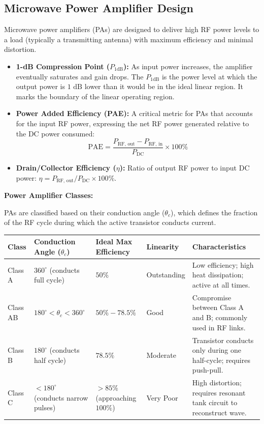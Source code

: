 \documentclass[12pt,a4paper]{article}
\renewcommand{\arraystretch}{1.45}
\begin{document}
\subsection{Microwave Power Amplifier Design}
Microwave power amplifiers (PAs) are designed to deliver high RF power levels to a load (typically a transmitting antenna) with maximum efficiency and minimal distortion.
\begin{itemize}[leftmargin=*, itemsep=3pt]
  \item \textbf{1-dB Compression Point ($P_{1\text{dB}}$):} As input power increases, the amplifier eventually saturates and gain drops. The $P_{1\text{dB}}$ is the power level at which the output power is $1\text{ dB}$ lower than it would be in the ideal linear region. It marks the boundary of the linear operating region.
  \item \textbf{Power Added Efficiency (PAE):} A critical metric for PAs that accounts for the input RF power, expressing the net RF power generated relative to the DC power consumed:
    \begin{equation}
      \text{PAE} = \frac{P_{\text{RF, out}} - P_{\text{RF, in}}}{P_{\text{DC}}} \times 100\%
    \end{equation}
  \item \textbf{Drain/Collector Efficiency ($\eta$):} Ratio of output RF power to input DC power: $\eta = P_{\text{RF, out}}/P_{\text{DC}} \times 100\%$.
\end{itemize}

\textbf{Power Amplifier Classes:}\par\noindent
PAs are classified based on their conduction angle ($\theta_c$), which defines the fraction of the RF cycle during which the active transistor conducts current.
\par\noindent
{\renewcommand{\arraystretch}{1.65}%
\begin{tabularx}{\linewidth}{|B{1.6cm}|Y|Y|Y|Y|}\hline
\textbf{Class} & \textbf{Conduction Angle ($\theta_c$)} & \textbf{Ideal Max Efficiency} & \textbf{Linearity} & \textbf{Characteristics} \\[4pt]
\hline
Class A & $360^\circ$ (conducts full cycle) & $50\%$ & Outstanding & Low efficiency; high heat dissipation; active at all times. \\[4pt]
\hline
Class AB & $180^\circ < \theta_c < 360^\circ$ & $50\% - 78.5\%$ & Good & Compromise between Class A and B; commonly used in RF links. \\[4pt]
\hline
Class B & $180^\circ$ (conducts half cycle) & $78.5\%$ & Moderate & Transistor conducts only during one half-cycle; requires push-pull. \\[4pt]
\hline
Class C & $<180^\circ$ (conducts narrow pulses) & $>85\%$ (approaching $100\%$) & Very Poor & High distortion; requires resonant tank circuit to reconstruct wave. \\[4pt]
\hline
\end{tabularx}
}
\end{document}

